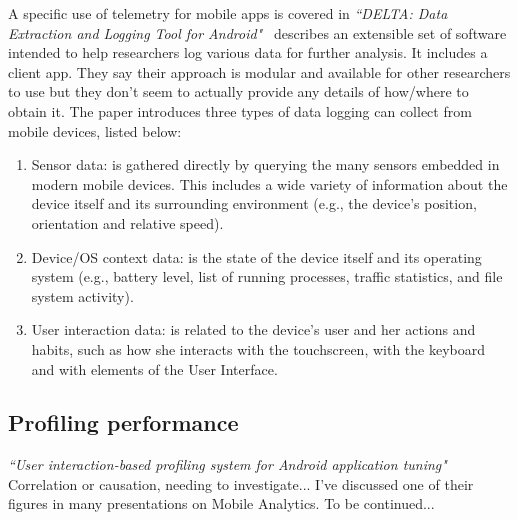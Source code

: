 A specific use of telemetry for mobile apps is covered in \emph{``DELTA: Data Extraction and Logging Tool for Android"}~\citep{spolaor2018_delta_data_extraction_and_logging_tool_for_android} describes an extensible set of software intended to help researchers log various data for further analysis. It includes a client app. They say their approach is modular and available for other researchers to use but they don't seem to actually provide any details of how/where to obtain it. The paper introduces three types of data logging can collect from mobile devices, listed below:
    \begin{enumerate}
        \item Sensor data: is gathered directly by querying the many sensors embedded in modern mobile devices. This includes a wide variety of information about the device itself and its surrounding environment (e.g., the device's position, orientation and relative speed).
        \item  Device/OS context data: is the state of the device itself and its operating system (e.g., battery level, list of running processes, traffic statistics, and file system activity).
        \item User interaction data: is related to the device's user and her actions and habits, such as how she interacts with the touchscreen, with the keyboard and with elements of the User Interface.
    \end{enumerate}

\subsection{Profiling performance}
\emph{``User interaction-based profiling system for Android application tuning"}~\cite{lee2014_user_interaction_based_profiling_system_for_android_app_tuning} Correlation or causation, needing to investigate... I've discussed one of their figures in many presentations on Mobile Analytics. To be continued...
    


